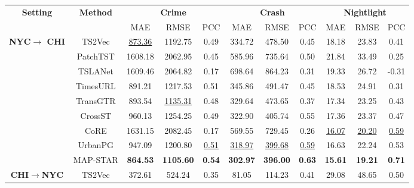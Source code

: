 \begin{table}[htbp]
\centering
\setlength{\tabcolsep}{8pt}
\renewcommand\arraystretch{1.0}
\begin{tabular}{c|c|ccc|ccc|ccc}
\toprule
\multirow{2}{*}{\textbf{Setting}}
 & \multirow{2}{*}{\textbf{Method}}
 & \multicolumn{3}{c|}{\textbf{Crime}}
 & \multicolumn{3}{c|}{\textbf{Crash}}
 & \multicolumn{3}{c}{\textbf{Nightlight}} \\ \cmidrule(lr){3-5}\cmidrule(lr){6-8}\cmidrule(lr){9-11}
 &  & MAE & RMSE & PCC & MAE & RMSE & PCC & MAE & RMSE & PCC \\
\midrule
\multirow{9}{*}{\textbf{NYC$\rightarrow$ CHI}}
 & TS2Vec             & \underline{873.36}      & 1192.75      & 0.49   & 334.72      & 478.50      & 0.45   & 18.18      & 23.83      & 0.41 \\
 & PatchTST         & 1608.18      & 2062.95      & 0.45   & 585.96      & 735.64      & 0.50   & 21.84      & 33.49      & 0.25 \\
 & TSLANet                & 1609.46      & 2064.82      & 0.17   & 698.64      & 864.23      & 0.31   & 19.33      & 26.72      & -0.31\\
 & TimesURL                & 891.21      & 1217.53      & 0.51   & 345.86      & 491.47      & 0.45   & 18.53      & 24.91      & 0.31 \\ \cmidrule(lr){2-11}
 & TransGTR             & 893.54      & \underline{1135.31}      & 0.48   & 329.64      & 473.65      & 0.37   & 17.34      & 23.25      & 0.43\\
 & CrossST                 & 960.13      & 1254.25      & 0.49   & 322.90      & 405.74      & 0.55   & 17.36      & 23.37      & 0.47\\
 & CoRE                 & 1631.15      & 2082.45      & 0.17   & 569.55      & 729.45      & 0.26   & \underline{16.07}      & \underline{20.20}      & \underline{0.59}\\
  & UrbanPG             & 947.09      & 1200.80      & \underline{0.51}   & \underline{318.97}      & \underline{399.68}      & \underline{0.59}   & 16.63      & 22.24      & 0.53\\ \cmidrule(lr){2-11}
 & MAP-STAR     & \textbf{864.53}  & \textbf{1105.60} & \textbf{0.54} & \textbf{302.97}  & \textbf{396.00}  & \textbf{0.63} & \textbf{15.61}   & \textbf{19.21}   & \textbf{0.71}\\
\midrule
\multirow{9}{*}{\textbf{CHI$\rightarrow$NYC}}
 & TS2Vec             & 372.61      & 524.24      & 0.35   & 81.05      & 114.23      & 0.41   & 29.08      & 48.65      & 0.50\\

\end{tabular}
\end{table}
